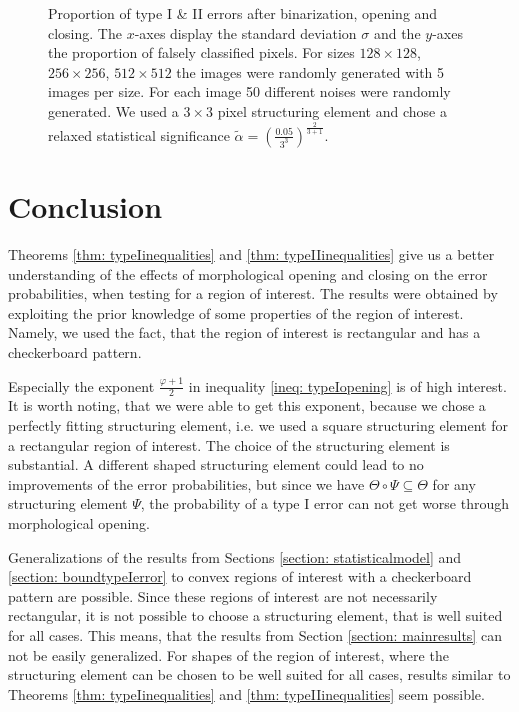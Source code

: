 \documentclass[a4paper,12pt]{article}
\theoremstyle{plain}
\theoremstyle{definition}
\begin{document}
\begin{figure}[H]
\begin{subfigure}[t]{0.48\linewidth}
	\end{subfigure}
	\caption{Proportion of type I \& II errors after binarization, opening and closing. The $x$-axes display the standard deviation $\sigma$ and the $y$-axes the proportion of falsely classified pixels. For sizes $128 \times 128$, $256 \times 256$, $512 \times 512$ the images were randomly generated with 5 images per size. For each image 50 different noises were randomly generated. We used a $3 \times 3$ pixel structuring element and chose a relaxed statistical significance $\tilde{\alpha} = \left( \frac{0.05}{3^3} \right)^{\frac{2}{3 + 1}}$.}
	\label{fig: simulationresults_relaxed}
\end{figure}

\newpage

\section{Conclusion}\label{section: conclusion}

Theorems \ref{thm: typeIinequalities} and \ref{thm: typeIIinequalities} give us a better understanding of the effects of morphological opening and closing on the error probabilities, when testing for a region of interest. The results were obtained by exploiting the prior knowledge of some properties of the region of interest. Namely, we used the fact, that the region of interest is rectangular and has a checkerboard pattern.

Especially the exponent $\frac{\varphi + 1}{2}$ in inequality \eqref{ineq: typeIopening} is of high interest. It is worth noting, that we were able to get this exponent, because we chose a perfectly fitting structuring element, i.e. we used a square structuring element for a rectangular region of interest. The choice of the structuring element is substantial. A different shaped structuring element could lead to no improvements of the error probabilities, but since we have $\Theta \circ \Psi \subseteq \Theta$ for any structuring element $\Psi$, the probability of a type I error can not get worse through morphological opening.

Generalizations of the results from Sections \ref{section: statisticalmodel} and \ref{section: boundtypeIerror} to convex regions of interest with a checkerboard pattern are possible. Since these regions of interest are not necessarily rectangular, it is not possible to choose a structuring element, that is well suited for all cases. This means, that the results from Section \ref{section: mainresults} can not be easily generalized. For shapes of the region of interest, where the structuring element can be chosen to be well suited for all cases, results similar to Theorems \ref{thm: typeIinequalities} and \ref{thm: typeIIinequalities} seem possible.
\end{document}
